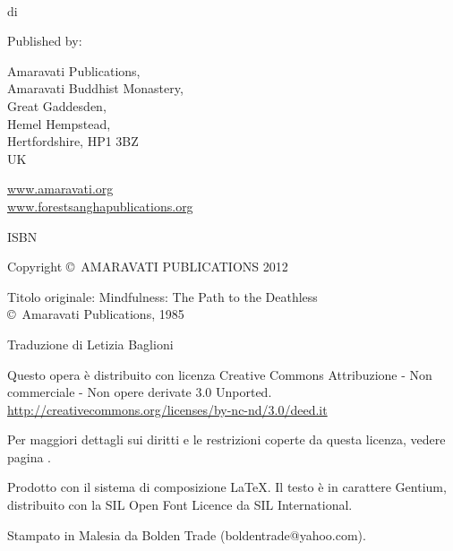 {\small\setlength{\parskip}{0.8em}\setlength{\parindent}{0em}%
{\raggedright%

\thetitle\\
di \theauthor

Published by:

Amaravati Publications,\\
Amaravati Buddhist Monastery,\\
Great Gaddesden, \\
Hemel Hempstead, \\
Hertfordshire, HP1 3BZ\\
UK

\href{http://amaravati.org}{www.amaravati.org}\\
\href{http://forestsanghapublications.org/}{www.forestsanghapublications.org}

ISBN \theISBN

Copyright \copyright\ AMARAVATI PUBLICATIONS 2012


Titolo originale: Mindfulness: The Path to the Deathless\\
\copyright\ Amaravati Publications, 1985

Traduzione di Letizia Baglioni


\vfill

{\footnotesize

Questo opera è distribuito con licenza Creative Commons Attribuzione - Non commerciale - Non opere derivate 3.0 Unported.\\
\href{http://creativecommons.org/licenses/by-nc-nd/3.0/deed.it}{http://creativecommons.org/licenses/by-nc-nd/3.0/deed.it}

Per maggiori dettagli sui diritti e le restrizioni coperte da questa licenza, vedere pagina \pageref{copyright-details}.

Prodotto con il sistema di composizione {\selectfont\LaTeX}. Il testo è in carattere Gentium, distribuito con la SIL Open Font Licence da SIL International.

\theEditionInfo

Stampato in Malesia da Bolden Trade (boldentrade@yahoo.com).

}

}}

